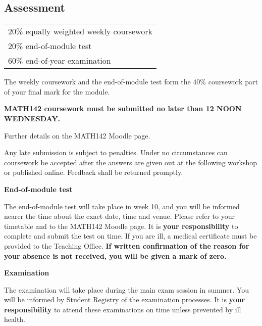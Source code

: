 \documentclass[12pt]{article}
\theoremstyle{definition}
\newcounter{ex}\renewcommand\theex{\arabic{ex}}
\begin{document}
\subsection{Assessment}

\begin{tabular}{l}
20\% equally weighted weekly coursework \\
20\% end-of-module test\\
60\% end-of-year examination
\end{tabular}

\smallskip
The weekly coursework and the end-of-module test form the 40\%
coursework part of your final mark for the module.


\smallskip
{\bf MATH142 coursework must be submitted no later than 12 NOON WEDNESDAY.} 

Further details on the MATH142 Moodle page.

\smallskip
Any late
submission is subject to penalties. Under no circumstances can
coursework be accepted after the answers are given out at the
following workshop or published online. 
Feedback shall be returned promptly.

\smallskip
{\bf End-of-module test}

\smallskip
The end-of-module test will take place in week 10, and you will be informed
nearer the time about the exact date, time and venue. Please refer to
your timetable and to the MATH142 Moodle page.
It is {\bf your responsibility} to complete and submit the test on
time. 
If you are ill, a medical certificate must be
provided to the Teaching Office.
{\bf If written confirmation of the reason for your absence is not
received, you will be given a mark of zero.}

\smallskip
{\bf Examination}

\smallskip
The examination will take place during the main exam session in
summer. You will be informed by Student Registry of the examination
processes. It is {\bf your responsibility} to attend these
examinations on time unless prevented by ill health.
\end{document}

